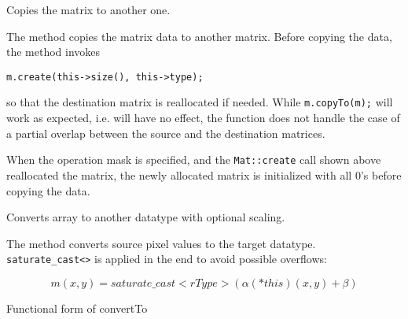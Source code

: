 Copies the matrix to another one.

\begin{description}
\end{description}

The method copies the matrix data to another matrix. Before copying the data, the method invokes

\begin{lstlisting}
m.create(this->size(), this->type);
\end{lstlisting}

so that the destination matrix is reallocated if needed. While \texttt{m.copyTo(m);} will work as expected, i.e. will have no effect, the function does not handle the case of a partial overlap between the source and the destination matrices. 

When the operation mask is specified, and the \texttt{Mat::create} call shown above reallocated the matrix, the newly allocated matrix is initialized with all 0's before copying the data.


Converts array to another datatype with optional scaling.

\begin{description}
\end{description}

The method converts source pixel values to the target datatype. \texttt{saturate\_cast<>} is applied in the end to avoid possible overflows:

\[
m(x,y) = saturate\_cast<rType>(\alpha (*this)(x,y) + \beta)
\]

Functional form of convertTo

